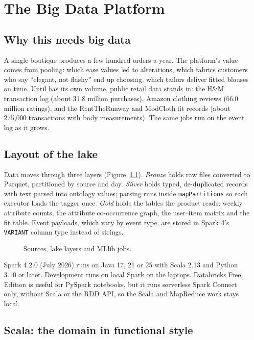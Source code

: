 \chapter{The Big Data Platform}\label{ch:data}

\section{Why this needs big data}

A single boutique produces a few hundred orders a year. The platform's value comes from pooling: which ease values led to alterations, which fabrics customers who say ``elegant, not flashy'' end up choosing, which tailors deliver fitted blouses on time. Until \sys{} has its own volume, public retail data stands in: the H\&M transaction log (about 31.8 million purchases), Amazon clothing reviews (66.0 million ratings), and the RentTheRunway and ModCloth fit records (about 275,000 transactions with body measurements). The same jobs run on the \sys{} event log as it grows.

\section{Layout of the lake}

Data moves through three layers (Figure~\ref{fig:lake}). \emph{Bronze} holds raw files converted to Parquet, partitioned by source and day. \emph{Silver} holds typed, de-duplicated records with text parsed into ontology values; parsing runs inside \texttt{mapPartitions} so each executor loads the tagger once. \emph{Gold} holds the tables the product reads: weekly attribute counts, the attribute co-occurrence graph, the user--item matrix and the fit table. Event payloads, which vary by event type, are stored in Spark 4's \texttt{VARIANT} column type instead of strings.

\begin{figure}[h]
\centering
\caption{Sources, lake layers and MLlib jobs.}\label{fig:lake}
\end{figure}

Spark 4.2.0 (July 2026) runs on Java 17, 21 or 25 with Scala 2.13 and Python 3.10 or later. Development runs on local Spark on the laptops. Databricks Free Edition is useful for PySpark notebooks, but it runs serverless Spark Connect only, without Scala or the RDD API, so the Scala and MapReduce work stays local.

\section{Scala: the domain in functional style}

